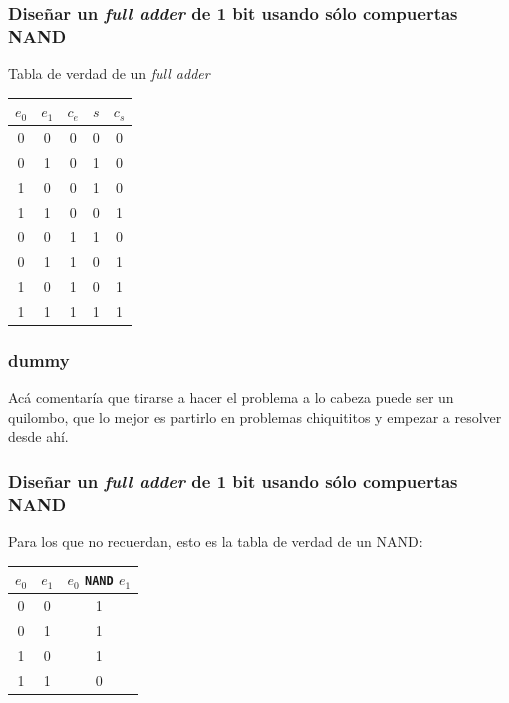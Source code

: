 \documentclass[mathserif,hyperref={pdfpagelabels=false}]{beamer}
\begin{document}
\begin{frame}
\frametitle{\small Diseñar un \textit{full adder} de 1 bit usando sólo
compuertas NAND}
Tabla de verdad de un \textit{full adder}
\begin{center}\begin{tabular}{| c | c | c || c | c |}
  \hline
  $e_0$ & $e_1$ & $c_e$ & $s$ & $c_s$ \\ \hline
    0   &   0   &   0   &  0  &   0   \\
    0   &   1   &   0   &  1  &   0   \\
    1   &   0   &   0   &  1  &   0   \\
    1   &   1   &   0   &  0  &   1   \\
    0   &   0   &   1   &  1  &   0   \\
    0   &   1   &   1   &  0  &   1   \\
    1   &   0   &   1   &  0  &   1   \\
    1   &   1   &   1   &  1  &   1   \\
  \hline
\end{tabular}\end{center}
\end{frame}


\begin{frame}
\frametitle{dummy}
Acá comentaría que tirarse a hacer el problema a lo cabeza puede ser un
quilombo, que lo mejor es partirlo en problemas chiquititos y empezar a
resolver desde ahí.
\end{frame}


\begin{frame}
\frametitle{\small Diseñar un \textit{full adder} de 1 bit usando sólo
compuertas NAND}
Para los que no recuerdan, esto es la tabla de verdad de un NAND:
\begin{center}\begin{tabular}{| c | c || c |}
  \hline
  $e_0$ & $e_1$ & $e_0$ \texttt{NAND} $e_1$ \\ \hline
    0   &   0   &             1             \\
    0   &   1   &             1             \\
    1   &   0   &             1             \\
    1   &   1   &             0             \\
  \hline
\end{tabular}\end{center}
\end{frame}
\end{document}
